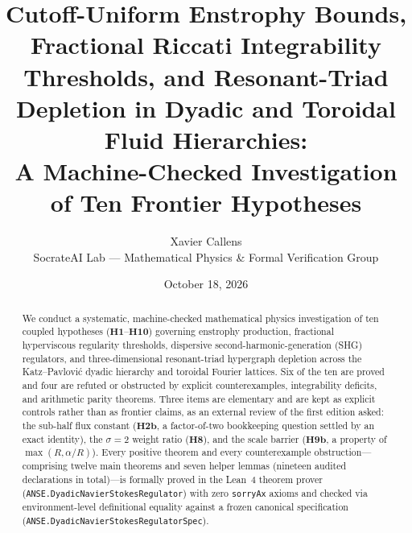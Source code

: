 \documentclass[11pt,a4paper]{article}
\title{\textbf{Cutoff-Uniform Enstrophy Bounds, Fractional Riccati Integrability Thresholds, and Resonant-Triad Depletion in Dyadic and Toroidal Fluid Hierarchies:\\
A Machine-Checked Investigation of Ten Frontier Hypotheses}}
\author{Xavier Callens\\
\small SocrateAI Lab --- Mathematical Physics \& Formal Verification Group}
\date{October 18, 2026}
\theoremstyle{definition}
\theoremstyle{remark}
\begin{document}
\maketitle

\begin{abstract}
We conduct a systematic, machine-checked mathematical physics investigation of ten coupled hypotheses ($\mathbf{H1}$--$\mathbf{H10}$) governing enstrophy production, fractional hyperviscous regularity thresholds, dispersive second-harmonic-generation (SHG) regulators, and three-dimensional resonant-triad hypergraph depletion across the Katz--Pavlovi\'c dyadic hierarchy and toroidal Fourier lattices. Six of the ten are proved and four are refuted or obstructed by explicit counterexamples, integrability deficits, and arithmetic parity theorems. Three items are elementary and are kept as explicit controls rather than as frontier claims, as an external review of the first edition asked: the sub-half flux constant ($\mathbf{H2b}$, a factor-of-two bookkeeping question settled by an exact identity), the $\sigma=2$ weight ratio ($\mathbf{H8}$), and the scale barrier ($\mathbf{H9b}$, a property of $\max(R,\alpha/R)$). Every positive theorem and every counterexample obstruction---comprising twelve main theorems and seven helper lemmas (nineteen audited declarations in total)---is formally proved in the Lean~4 theorem prover (\texttt{ANSE.DyadicNavierStokesRegulator}) with zero \texttt{sorryAx} axioms and checked via environment-level definitional equality against a frozen canonical specification (\texttt{ANSE.DyadicNavierStokesRegulatorSpec}).


\end{abstract}
\end{document}
